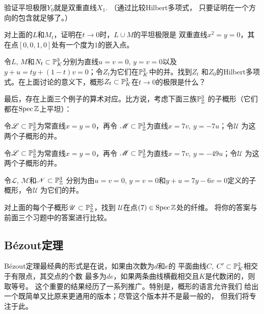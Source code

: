 \begin{exe}\label{exe:3.67}
验证平坦极限$Y_0$就是双重直线$X_1$. （通过比较Hilbert多项式，
只要证明在一个方向的包含就足够了。）
\end{exe}

\nottran

\begin{exe}\label{exe:3.68}
对上面的$L$和$M_t$，证明在$t\to 0$时，$L\cup M$的平坦极限是
双重直线$x^2=y=0$，其在点$[0,0,1,0]$处有一个度为$1$的嵌入点。
\end{exe}


\begin{exe}\label{exe:3.69}
令$L$, $M$和$N_t\subset \P_K^3$分别为直线$u=v=0$, $y=v=0$以及
$y+u=ty+(1-t)v=0$；令$Z_t$为它们在$\P_K^3$中的并。找到$Z_t$
和$Z_0$的Hilbert多项式。在上面讨论的意义下，概形$Z_t\subset 
\P_K^3$在$t\to 0$的极限是什么？
\end{exe}


最后，存在上面三个例子的算术对应。比方说，考虑下面三族$\P_\zz^3$
的子概形（它们都在$\spec \zz$上平坦）：
\begin{compactenum}[(a)]
\item 令$\mathscr L\subset \P_\zz^3$为常直线$x=y=0$，再令
$\mathscr M\subset \P_\zz^3$为直线$x=7v$, $y=-7u$；令$\mathscr U$
为这两个子概形的并。
\item 令$\mathscr L\subset \P_\zz^3$为常直线$x=y=0$，再令
$\mathscr M\subset \P_\zz^3$为直线$x=7v$, $y=-49u$；令$\mathscr U$
为这两个子概形的并。
\item 令$\mathscr L$, $\mathscr M$和$\mathscr N\subset \P_\zz^3$
分别为由$u=v=0$, $y=v=0$和$y+u=7y-6v=0$定义的子概形，令$\mathscr U$
为它们的并。
\end{compactenum}

\begin{exe}\label{exe:3.70}
对上面的每个子概形$\mathscr U\subset \P_\zz^3$，找到
$\mathscr U$在点$(7)\in\spec \zz$处的纤维。
将你的答案与前面三个习题中的答案进行比较。
\end{exe}

\subsection{B\texorpdfstring{\'{e}}{é}zout定理}
\label{s:3.3.5}

B\'ezout定理最经典的形式是在说，如果由次数为$d$和$e$的
平面曲线$C$, $C'\subset \P_K^2$相交于有限点，其交点的个数
最多为$de$，如果两条曲线横截相交且$K$是代数闭的，则取等号。
这个重要的结果经历了一系列推广。特别是，概形的语言允许我们
给出一个既简单又比原来更通用的版本；尽管这个版本并不是最一般的，
但我们将专注于此。

